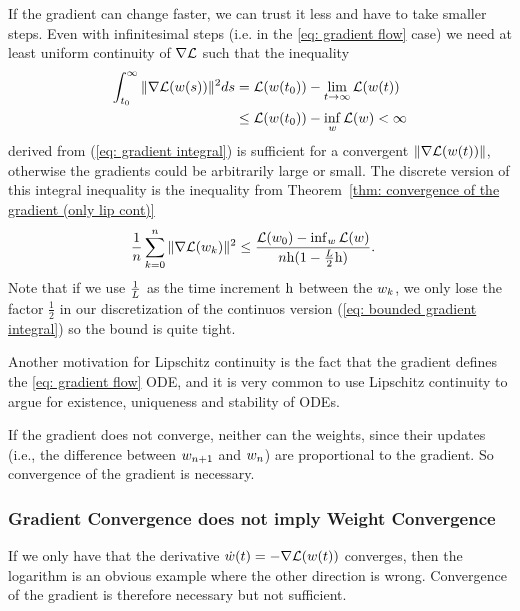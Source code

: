 If the gradient can change faster, we can trust it less and have to take smaller
steps. Even with infinitesimal steps (i.e. in the \ref{eq: gradient flow} case)
we need at least uniform continuity of \(\nabla\mathcal{L}\) such that the inequality
\begin{align}\label{eq: bounded gradient integral}
	\int_{t_0}^\infty \|\nabla \mathcal{L}(w(s))\|^2 ds
	&= \mathcal{L}(w(t_0)) - \lim_{t\to\infty} \mathcal{L}(w(t)) \\
	&\le \mathcal{L}(w(t_0)) - \inf_{w} \mathcal{L}(w) < \infty \nonumber
\end{align}
%
derived from (\ref{eq: gradient integral}) is sufficient for a convergent
\(\|\nabla \mathcal{L}(w(t))\|\), otherwise the gradients could be arbitrarily
large or small. The discrete version of this integral inequality is the inequality
from Theorem~\ref{thm: convergence of the gradient (only lip cont)}
\begin{align*}
	\frac1{n}\sum_{k=0}^n \|\nabla\mathcal{L}(w_k)\|^2
	&\le \frac{\mathcal{L}(w_0) - \inf_{w}\mathcal{L}(w)}{n\text{h}(1-\tfrac{L}2\text{h})}.
\end{align*} 
Note that if we use \(\tfrac{1}{L}\) as the time increment \(\text{h}\)
between the \(w_k\), we only lose the factor \(\tfrac12\) in our
discretization of the continuos version (\ref{eq: bounded gradient integral}) so
the bound is quite tight.

Another motivation for Lipschitz continuity is the fact that the gradient defines
the \ref{eq: gradient flow} ODE, and it is very common to use Lipschitz
continuity to argue for existence, uniqueness and stability of ODEs.

If the gradient does not converge, neither can the weights, since their updates
(i.e., the difference between \(w_{n+1}\) and \(w_n\))
are proportional to the gradient. So convergence of the gradient is necessary.

\subsubsection{Gradient Convergence does not imply Weight Convergence}

If we only have that the derivative \(\dot{w}(t) = -\nabla \mathcal{L}(w(t))\)
converges, then the logarithm is an obvious example where the other direction
is wrong. Convergence of the gradient is therefore necessary but not
sufficient.

